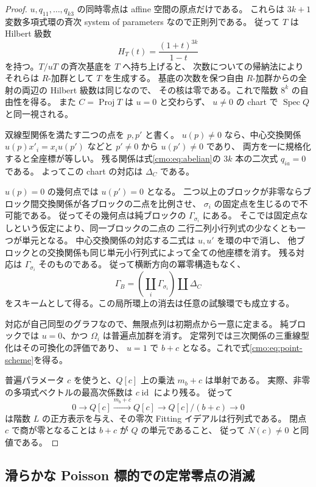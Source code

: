 \begin{proof}
$u,q_{11},\ldots,q_{k3}$ の同時零点は affine 空間の原点だけである。
これらは $3k+1$ 変数多項式環の斉次 system of parameters なので正則列である。
従って $T$ は Hilbert 級数
\[
 H_T(t)=\frac{(1+t)^{3k}}{1-t}
\]
を持つ。$T/uT$ の斉次基底を $T$ へ持ち上げると、
次数についての帰納法によりそれらは $R$-加群として $T$ を生成する。
基底の次数を保つ自由 $R$-加群からの全射の両辺の Hilbert 級数は同じなので、
その核は零である。これで階数 $8^k$ の自由性を得る。
また $C=\operatorname{Proj}T$ は $u=0$ と交わらず、
$u\ne0$ の chart で $\operatorname{Spec}Q$ と同一視される。

双線型関係を満たす二つの点を $p,p'$ と書く。
$u(p)\ne0$ なら、中心交換関係
$u(p)x'_i=x_i u(p')$ などと $p'\ne0$ から $u(p')\ne0$ であり、
両方を一に規格化すると全座標が等しい。
残る関係は式\eqref{cmo:eq:abelian}の $3k$ 本の二次式 $q_{ia}=0$ である。
よってこの chart の対応は $\Delta_C$ である。

$u(p)=0$ の幾何点では $u(p')=0$ となる。
二つ以上のブロックが非零ならブロック間交換関係が各ブロックの二点を比例させ、
$\sigma_i$ の固定点を生じるので不可能である。
従ってその幾何点は純ブロックの $\Gamma_{\sigma_i}$ にある。
そこでは固定点なしという仮定により、同一ブロックの二点の
二行二列小行列式の少なくとも一つが単元となる。
中心交換関係の対応する二式は $u,u'$ を環の中で消し、
他ブロックとの交換関係も同じ単元小行列式によって全ての他座標を消す。
残る対応は $\Gamma_{\sigma_i}$ そのものである。
従って横断方向の冪零構造もなく、
\[
 \Gamma_B=\left(\coprod_i\Gamma_{\sigma_i}\right)\amalg\Delta_C
\]
をスキームとして得る。この局所環上の消去は任意の試験環でも成立する。

対応が自己同型のグラフなので、無限点列は初期点から一意に定まる。
純ブロックでは $u=0$、かつ $\Omega_i$ は普遍点加群を消す。
定常列では三次関係の三重線型化はその可換化の評価であり、
$u=1$ で $b+c$ となる。これで式\eqref{cmo:eq:point-scheme}を得る。

普遍パラメータ $c$ を使うと、$Q[c]$ 上の乗法 $m_b+c$ は単射である。
実際、非零の多項式ベクトルの最高次係数は $c\operatorname{id}$ により残る。
従って
\[
 0\longrightarrow Q[c]\xrightarrow{m_b+c}Q[c]
   \longrightarrow Q[c]/(b+c)\longrightarrow0
\]
は階数 $L$ の正方表示を与え、その零次 Fitting イデアルは行列式である。
閉点 $c$ で商が零となることは $b+c$ が $Q$ の単元であること、
従って $N(c)\ne0$ と同値である。
\end{proof}

\subsection{滑らかな Poisson 標的での定常零点の消滅}

